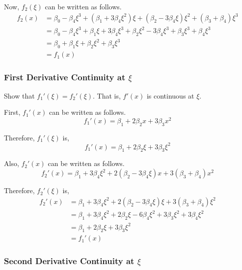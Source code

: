 \documentclass{article}
\begin{document}
Now, $f_2\left(\xi\right)$ can be written as follows.
\begin{equation*}
    \begin{split}
        f_2\left(x\right) &= \beta_0 - \beta_4 \xi^3  + \left(\beta_1 + 3 \beta_4 \xi^2 \right) \xi + \left(\beta_2 - 3 \beta_4 \xi \right) \xi^2 + \left(\beta_3 + \beta_4\right) \xi^3 \\
        &= \beta_0 - \beta_4 \xi^3  + \beta_1 \xi + 3 \beta_4 \xi^3 + \beta_2 \xi^2 - 3 \beta_4 \xi^3 + \beta_3 \xi^3 + \beta_4 \xi^3 \\
        &= \beta_0 + \beta_1 \xi + \beta_2 \xi^2 + \beta_3 \xi^3 \\
        &= f_1\left(x\right)
    \end{split}
\end{equation*}

\subsubsection{First Derivative Continuity at $\xi$}
\question
Show that $f_1'\left(\xi\right) = f_2'\left(\xi\right)$.
That is, $f'\left(x\right)$ is continuous at $\xi$.

\answer
First, $f_1'\left(x\right)$ can be written as follows.
\[
    f_1'\left(x\right) = \beta_1 + 2 \beta_2 x + 3 \beta_3 x^2
\]

Therefore, $f_1'\left(\xi\right)$ is,
\[
    f_1'\left(x\right) = \beta_1 + 2 \beta_2 \xi + 3 \beta_3 \xi^2
\]

Also, $f_2'\left(x\right)$ can be written as follows.
\[
    f_2'\left(x\right) = \beta_1 + 3 \beta_4 \xi^2 + 2 \left(\beta_2 - 3 \beta_4 \xi \right) x + 3 \left(\beta_3 + \beta_4\right) x^2
\]

Therefore, $f_2'\left(\xi\right)$ is,
\begin{equation*}
    \begin{split}
        f_2'\left(x\right) &= \beta_1 + 3 \beta_4 \xi^2 + 2 \left(\beta_2 - 3 \beta_4 \xi \right) \xi + 3 \left(\beta_3 + \beta_4\right) \xi^2 \\
        &= \beta_1 + 3 \beta_4 \xi^2 + 2 \beta_2 \xi - 6 \beta_4 \xi^2 + 3 \beta_3 \xi^2 + 3 \beta_4 \xi^2 \\
        &= \beta_1 + 2 \beta_2 \xi + 3 \beta_3 \xi^2 \\
        &= f_1'\left(x\right)
    \end{split}
\end{equation*}

\subsubsection{Second Derivative Continuity at $\xi$}
\end{document}
